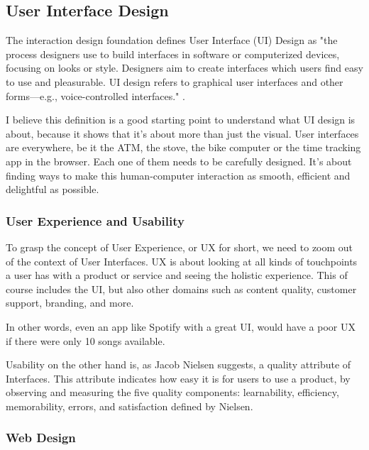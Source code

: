 \subsection{User Interface Design}
The interaction design foundation defines User Interface (UI) Design as "the process designers use
to build interfaces in software or computerized devices, focusing on looks or style. Designers aim
to create interfaces which users find easy to use and pleasurable. UI design refers to graphical
user interfaces and other forms—e.g., voice-controlled interfaces."
.

I believe this definition is a good starting point to understand what UI design is about, because it
shows that it's about more than just the visual. User interfaces are everywhere, be it the ATM, the
stove, the bike computer or the time tracking app in the browser. Each one of them needs to be
carefully designed. It's about finding ways to make this human-computer interaction as smooth,
efficient and delightful as possible.


\subsubsection{User Experience and Usability}
To grasp the concept of User Experience, or UX for short, we need to zoom out of the context of User
Interfaces. UX is about looking at all kinds of touchpoints a user has with a product or service and
seeing the holistic experience. This of course includes the UI, but also other domains such as
content quality, customer support, branding, and more. 

In other words, even an app like Spotify with a great UI, would have a poor UX if there were only 10
songs available.

Usability on the other hand is, as Jacob Nielsen suggests, a quality attribute of Interfaces. This
attribute indicates how easy it is for users to use a product, by observing and measuring the five
quality components: learnability, efficiency, memorability, errors, and satisfaction
defined by Nielsen. 

\subsubsection{Web Design}

